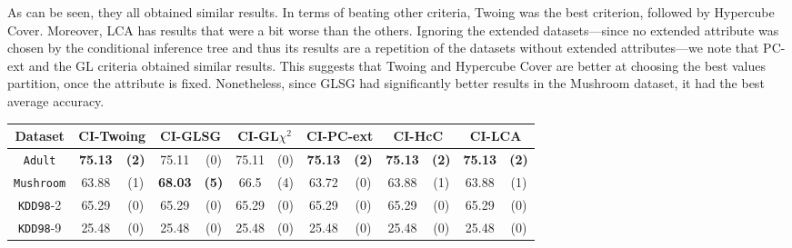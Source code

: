 As can be seen, they all obtained similar results. In terms of beating other criteria, Twoing was the best criterion, followed by Hypercube Cover. Moreover, LCA has results that were a bit worse than the others.  Ignoring the extended datasets---since no extended attribute was chosen by the conditional inference tree and thus its results are a repetition of the datasets without extended attributes---we note that PC-ext and the GL criteria obtained similar results. This suggests that Twoing and Hypercube Cover are better at choosing the best values partition, once the attribute is fixed. Nonetheless, since GLSG had significantly better results in the Mushroom dataset, it had the best average accuracy.


\begin{table*}
\scriptsize
\centering
\begin{tabular}{c|cc|cc|cc|cc|cc|cc} 
Dataset  &   \multicolumn{2}{c|}{CI-Twoing} &   \multicolumn{2}{c|}{CI-GLSG} & \multicolumn{2}{c|}{CI-GL$\chi^2$}& \multicolumn{2}{c|}{CI-PC-ext}& \multicolumn{2}{c|}{CI-HcC}& \multicolumn{2}{c}{CI-LCA} \\  \hline   
{\tt Adult}        &{\bf 75.13} & {\bf (2)} & 75.11       & (0)       & 75.11       & (0)       & {\bf 75.13} & {\bf (2)} & {\bf 75.13} & {\bf (2)} & {\bf 75.13} & {\bf (2)} \\
{\tt Mushroom}     &63.88       & (1)       &{\bf 68.03 } & {\bf (5)} & 66.5        & (4)       & 63.72       & (0)       & 63.88       & (1)       & 63.88       & (1)       \\
{\tt KDD98}-2      &65.29       & (0)       & 65.29       & (0)       & 65.29       & (0)       & 65.29       & (0)       & 65.29       & (0)       & 65.29       & (0)       \\
{\tt KDD98}-9      &25.48       & (0)       & 25.48       & (0)       & 25.48       & (0)       & 25.48       & (0)       & 25.48       & (0)       & 25.48       & (0)       \\

\end{tabular}
\end{table*}
